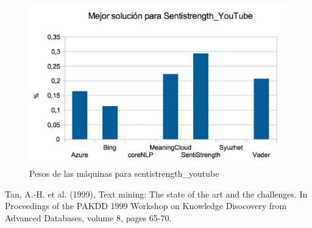\documentclass{article}
\begin{document}
\begin{figure} [H]
	\centering
	\includegraphics[width=0.7\linewidth]{youtube}
	\caption{Pesos de las máquinas para sentistrength\_youtube}
	\label{fig:youtube}
\end{figure}

\begin{thebibliography}{99}
 \hspace{-.22cm} Tan, A.-H. et al. (1999), Text mining: The state of the art and
	the challenges. In Proceedings of the PAKDD 1999 Workshop on Knowledge
	Disocovery from Advanced Databases, volume 8, pages 65-70.
\end{thebibliography}
\end{document}
